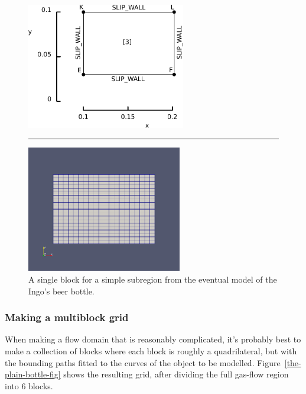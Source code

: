 \begin{figure}[htbp]
\begin{center}
\includegraphics[height=5.5cm]{../2D/beer-bottle/the_minimal_grid_edited.pdf}
\rule{0.5cm}{0cm}
\includegraphics[height=5.5cm]{../2D/beer-bottle/the_minimal_grid.png}
\end{center}
\caption{A single block for a simple subregion from the eventual model 
         of the Ingo's beer bottle.}
\label{the-minimal-grid-fig}
\end{figure}

\subsubsection*{Making a multiblock grid}
%
When making a flow domain that is reasonably complicated, it's probably best
to make a collection of blocks where each block is roughly a quadrilateral,
but with the bounding paths fitted to the curves of the object to be modelled.
Figure~\ref{the-plain-bottle-fig} shows the resulting grid, after dividing 
the full gas-flow region into 6 blocks.

\noindent
\topbar

\bottombar


